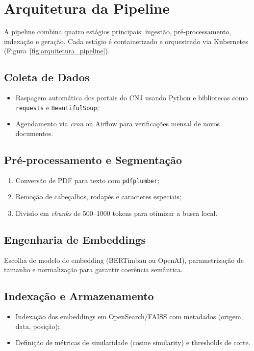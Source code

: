 \section{Arquitetura da Pipeline}
A pipeline combina quatro estágios principais: ingestão, pré‐processamento, indexação e geração. Cada estágio é containerizado e orquestrado via Kubernetes (Figura~\ref{fig:arquitetura_pipeline}).

\subsection{Coleta de Dados}
\begin{itemize}[label=\textbullet]
  \item Raspagem automática dos portais do CNJ usando Python e bibliotecas como \texttt{requests} e \texttt{BeautifulSoup};
  \item Agendamento via \emph{cron} ou Airflow para verificações mensal de novos documentos.
\end{itemize}

\subsection{Pré-processamento e Segmentação}
\begin{enumerate}[label=\arabic*.]
  \item Conversão de PDF para texto com \texttt{pdfplumber};
  \item Remoção de cabeçalhos, rodapés e caracteres especiais;
  \item Divisão em \emph{chunks} de 500--1000 tokens para otimizar a busca local.
\end{enumerate}

\subsection{Engenharia de Embeddings}
Escolha de modelo de embedding (BERTimbau ou OpenAI), parametrização de tamanho e normalização para garantir coerência semântica.

\subsection{Indexação e Armazenamento}
\begin{itemize}[label=\textbullet]
  \item Indexação dos embeddings em OpenSearch/FAISS com metadados (origem, data, posição);
  \item Definição de métricas de similaridade (cosine similarity) e thresholds de corte.
\end{itemize}

